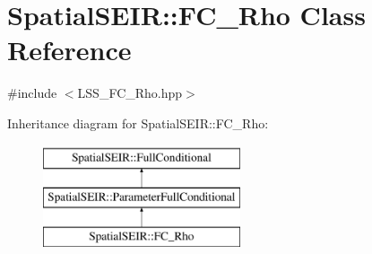 \hypertarget{classSpatialSEIR_1_1FC__Rho}{\section{Spatial\-S\-E\-I\-R\-:\-:F\-C\-\_\-\-Rho Class Reference}
\label{classSpatialSEIR_1_1FC__Rho}
}


{\ttfamily \#include $<$L\-S\-S\-\_\-\-F\-C\-\_\-\-Rho.\-hpp$>$}

Inheritance diagram for Spatial\-S\-E\-I\-R\-:\-:F\-C\-\_\-\-Rho\-:\begin{figure}[H]
\begin{center}
\leavevmode
\includegraphics[height=3.000000cm]{classSpatialSEIR_1_1FC__Rho}
\end{center}
\end{figure}
